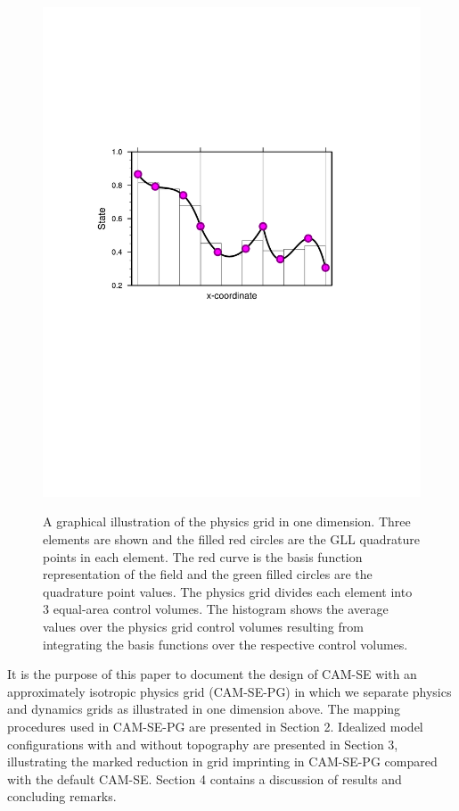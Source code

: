 \documentclass[twocol]{ametsoc}
\begin{document}
\begin{figure}[t]
\noindent\includegraphics[width=38pc,angle=0]{figs/physgrid-1d_3x3-arh.pdf}\\
\caption{A graphical illustration of the physics grid in one dimension. Three elements are shown and the filled red circles are the GLL quadrature points in each element. The red curve is the basis function representation of the field and the green filled circles are the quadrature point values. The physics grid divides each element into 3 equal-area control volumes. The histogram shows the average values over the physics grid control volumes resulting from integrating the basis functions over the respective control volumes.}
\label{fig:physgrid-1d}
\end{figure}


It is the purpose of this paper to document the design of CAM-SE with an approximately isotropic physics grid (CAM-SE-PG) in which we separate physics and dynamics grids as illustrated in one dimension above. The mapping procedures used in CAM-SE-PG are presented in Section 2. Idealized model configurations with and without topography are presented in Section 3, illustrating the marked reduction in grid imprinting in CAM-SE-PG compared with the default CAM-SE. Section 4 contains a discussion of results and concluding remarks. 
\end{document}
